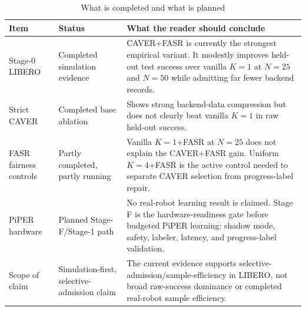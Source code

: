 \documentclass[10pt]{article}
\theoremstyle{plain}
\theoremstyle{definition}
\theoremstyle{remark}
\begin{document}
\begin{table}[H]
\centering
\small
\caption*{What is completed and what is planned}
\begin{tabularx}{\linewidth}{@{}p{3.2cm}p{4.2cm}X@{}}
\toprule
Item & Status & What the reader should conclude \\
\midrule
Stage-0 LIBERO & Completed simulation evidence & CAVER+FASR is currently the strongest empirical variant. It modestly improves held-out test success over vanilla $K=1$ at $N=25$ and $N=50$ while admitting far fewer backend records. \\
Strict CAVER & Completed base ablation & Shows strong backend-data compression but does not clearly beat vanilla $K=1$ in raw held-out success. \\
FASR fairness controls & Partly completed, partly running & Vanilla $K=1$+FASR at $N=25$ does not explain the CAVER+FASR gain. Uniform $K=4$+FASR is the active control needed to separate CAVER selection from progress-label repair. \\
PiPER hardware & Planned Stage-F/Stage-1 path & No real-robot learning result is claimed. Stage F is the hardware-readiness gate before budgeted PiPER learning: shadow mode, safety, labeler, latency, and progress-label validation. \\
Scope of claim & Simulation-first, selective-admission claim & The current evidence supports selective-admission/sample-efficiency in LIBERO, not broad raw-success dominance or completed real-robot sample efficiency. \\
\bottomrule
\end{tabularx}
\end{table}
\end{document}
